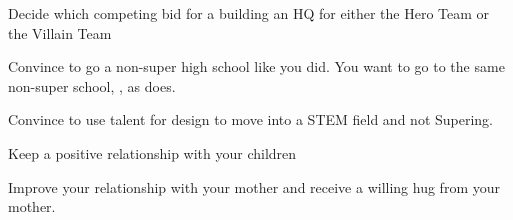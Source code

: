 \documentclass[char]{LRSguildcamp1}
\begin{document}
\begin{itemz}[Goals]
	\item Decide which competing bid for a building an HQ for either the Hero Team or the Villain Team
	
	\item Convince \cTween{} to go a non-super high school like you did. You want \cTween{} to go to the same non-super school, \pNormalSchool{}, as \cTeen{} does. 
	
	\item Convince \cTeen{} to use \cTeen{\their} talent for design to move into a STEM field and not Supering.
	
	\item Keep a positive relationship with your children
	
	\item Improve your relationship with your mother and receive a willing hug from your mother.  
	\end{itemz}

\begin{itemz}[Notes]
	\item 
\end{itemz}
\end{document}
